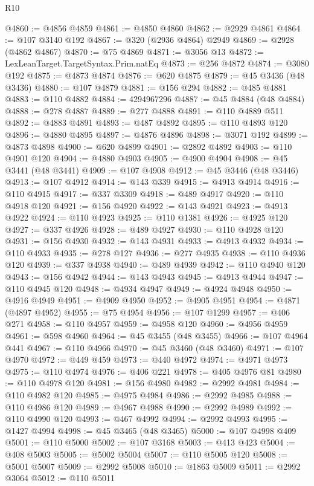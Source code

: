 \begin{lexlean}{R10}
\begin{coremodule}
@4860 := @4856 @4859
@4861 := @4850 @4860
@4862 := @2929 @4861
@4864 := @107 @3140 @192
@4867 := @320 (@2936 @4864) @2949
@4869 := @2928 (@4862 @4867)
@4870 := @75 @4869
@4871 := @3056 @13
@4872 := LexLeanTarget.TargetSyntax.Prim.natEq
@4873 := @256 @4872
@4874 := @3080 @192
@4875 := @4873 @4874
@4876 := @620 @4875
@4879 := @45 @3436 (@48 @3436)
@4880 := @107 @4879
@4881 := @156 @294
@4882 := @485 @4881
@4883 := @110 @4882
@4884 := 4294967296
@4887 := @45 @4884 (@48 @4884)
@4888 := @278 @4887
@4889 := @277 @4888
@4891 := @110 @4889 @511
@4892 := @4883 @4891
@4893 := @487 @4892
@4895 := @110 @4893 @120
@4896 := @4880 @4895
@4897 := @4876 @4896
@4898 := @3071 @192
@4899 := @4873 @4898
@4900 := @620 @4899
@4901 := @2892 @4892
@4903 := @110 @4901 @120
@4904 := @4880 @4903
@4905 := @4900 @4904
@4908 := @45 @3441 (@48 @3441)
@4909 := @107 @4908
@4912 := @45 @3446 (@48 @3446)
@4913 := @107 @4912
@4914 := @143 @339
@4915 := @4913 @4914
@4916 := @110 @4915
@4917 := @337 @3309
@4918 := @489 @4917
@4920 := @110 @4918 @120
@4921 := @156 @4920
@4922 := @143 @4921
@4923 := @4913 @4922
@4924 := @110 @4923
@4925 := @110 @1381
@4926 := @4925 @120
@4927 := @337 @4926
@4928 := @489 @4927
@4930 := @110 @4928 @120
@4931 := @156 @4930
@4932 := @143 @4931
@4933 := @4913 @4932
@4934 := @110 @4933
@4935 := @278 @127
@4936 := @277 @4935
@4938 := @110 @4936 @120
@4939 := @337 @4938
@4940 := @489 @4939
@4942 := @110 @4940 @120
@4943 := @156 @4942
@4944 := @143 @4943
@4945 := @4913 @4944
@4947 := @110 @4945 @120
@4948 := @4934 @4947
@4949 := @4924 @4948
@4950 := @4916 @4949
@4951 := @4909 @4950
@4952 := @4905 @4951
@4954 := @4871 (@4897 @4952)
@4955 := @75 @4954
@4956 := @107 @1299
@4957 := @406 @271
@4958 := @110 @4957
@4959 := @4958 @120
@4960 := @4956 @4959
@4961 := @598 @4960
@4964 := @45 @3455 (@48 @3455)
@4966 := @107 @4964 @441
@4967 := @110 @4966
@4970 := @45 @3460 (@48 @3460)
@4971 := @107 @4970
@4972 := @449 @459
@4973 := @440 @4972
@4974 := @4971 @4973
@4975 := @110 @4974
@4976 := @406 @221
@4978 := @405 @4976 @81
@4980 := @110 @4978 @120
@4981 := @156 @4980
@4982 := @2992 @4981
@4984 := @110 @4982 @120
@4985 := @4975 @4984
@4986 := @2992 @4985
@4988 := @110 @4986 @120
@4989 := @4967 @4988
@4990 := @2992 @4989
@4992 := @110 @4990 @120
@4993 := @467 @4992
@4994 := @2992 @4993
@4995 := @1427 @4994
@4998 := @45 @3465 (@48 @3465)
@5000 := @107 @4998 @409
@5001 := @110 @5000
@5002 := @107 @3168
@5003 := @413 @423
@5004 := @408 @5003
@5005 := @5002 @5004
@5007 := @110 @5005 @120
@5008 := @5001 @5007
@5009 := @2992 @5008
@5010 := @1863 @5009
@5011 := @2992 @3064
@5012 := @110 @5011

\end{coremodule}
\end{lexlean}
